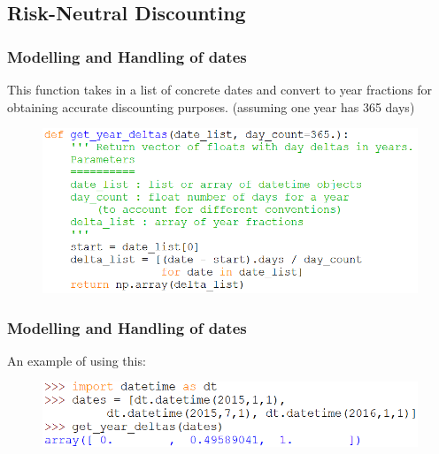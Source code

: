 \documentclass{beamer}
\begin{document}
\subsection{Risk-Neutral Discounting}

\begin{frame}
\frametitle{Modelling and Handling of dates}
This function takes in a list of concrete dates and convert to year fractions for obtaining accurate discounting purposes. (assuming one year has 365 days)
\begin{figure}[H]
	\includegraphics[scale=0.45]{get_year_deltas.png}
\end{figure}
\end{frame}

\begin{frame}
\frametitle{Modelling and Handling of dates}
An example of using this:
\begin{figure}[H]
	\includegraphics[scale=0.55]{get_year_deltas_example.png}
\end{figure}
\end{frame}
\end{document}
